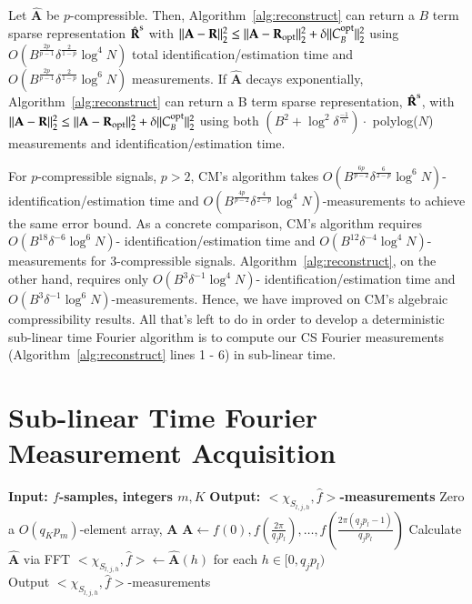 \documentclass{article}
\begin{document}
\begin{Theorem}
Let $\hat{\textbf{A}}$ be $p$-compressible.  Then, Algorithm~\ref{alg:reconstruct} can return a $B$ term sparse representation $\hat{\textbf{R}}^{\rm s}$ with $\| \textbf{A} - \textbf{R}\|^{2}_{2} \leq \| \textbf{A} - \textbf{R}_{\rm opt} \|^{2}_{2} + \delta \| C^{\rm opt}_{B} \|^{2}_{2}$ using $O \left( B^{\frac{2p}{p-1}} \delta^{\frac{2}{1-p}} \log^{4} N \right)$ total identification/estimation time and $O \left( B^{\frac{2p}{p-1}} \delta^{\frac{2}{1-p}} \log^{6} N \right)$ measurements.  If $\hat{\textbf{A}}$ decays exponentially, Algorithm~\ref{alg:reconstruct} can return a B term sparse representation, $\hat{\textbf{R}}^{\rm s}$, with $\| \textbf{A} - \textbf{R}\|^{2}_{2} \leq \| \textbf{A} - \textbf{R}_{\rm opt} \|^{2}_{2} + \delta \| C^{\rm opt}_{B} \|^{2}_{2}$ using both $\left( B^{2} + \log^{2} \delta^{\frac{-1}{\alpha}} \right) \cdot$ polylog($N$) measurements and identification/estimation time.
\label{thm:compress}
\end{Theorem}

For $p$-compressible signals, $p > 2$, CM's algorithm \cite{CMDetCS1,CMDetCS2} takes $O \left( B^{\frac{6p}{p-2}}\delta^{\frac{6}{2-p}} \log^{6} N \right)$- identification/estimation time and $O \left( B^{\frac{4p}{p-2}}\delta^{\frac{4}{2-p}} \log^{4} N \right)$-measurements to achieve the same error bound.  As a concrete comparison, CM's algorithm requires $O(B^{18} \delta^{-6} \log^{6} N)$- identification/estimation time and $O(B^{12} \delta^{-4} \log^{4} N)$-measurements for 3-compressible signals.  Algorithm~\ref{alg:reconstruct}, on the other hand, requires only $O(B^{3} \delta^{-1} \log^{4} N)$- identification/estimation time and $O( B^{3} \delta^{-1} \log^{6} N)$-measurements.  Hence, we have improved on CM's algebraic compressibility results.  All that's left to do in order to develop a deterministic sub-linear time Fourier algorithm is to compute our CS Fourier measurements (Algorithm~\ref{alg:reconstruct} lines 1 - 6) in sub-linear time.

\section{Sub-linear Time Fourier Measurement Acquisition}
\label{sec:fmeasure}

\begin{algorithm}[tb]
\begin{algorithmic}[1]
\caption{$\proc{Fourier Measure}$} \label{alg:fmeasure}
\STATE \textbf{Input:  $f$-samples, integers $m, K$} 
\STATE \textbf{Output:  $<\chi_{S_{l,j,h}}, \hat{f}>$-measurements}
\STATE Zero a $O(q_{K}p_{m})$-element array, \textbf{A} 
		\STATE $\textbf{A} \leftarrow f(0), f \left(\frac{2 \pi}{q_{j}p_{l}} \right), \dots, f \left( \frac{2 \pi (q_{j}p_{l} - 1)}{q_{j}p_{l}} \right)$
		\STATE Calculate $\hat{\textbf{A}}$ via FFT
		\STATE $<\chi_{S_{l,j,h}}, \hat{f}> \leftarrow \hat{\textbf{A}}(h)$ for each $h \in [0,q_{j}p_{l})$
	\ENDFOR
\ENDFOR \\
\STATE Output $<\chi_{S_{l,j,h}}, \hat{f}>$-measurements
\end{algorithmic}
\end{algorithm}
\end{document}
